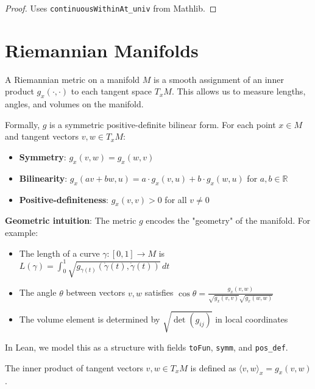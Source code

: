 \begin{proof}
\leanok
Uses \texttt{continuousWithinAt\_univ} from Mathlib.
\end{proof}

\chapter{Riemannian Manifolds}
\label{chap:riemannian}

\begin{definition}
\label{def:riemannian_metric}
\leanok
{}
A Riemannian metric on a manifold $M$ is a smooth assignment of an inner product $g_x(\cdot,\cdot)$ to each tangent space $T_xM$. This allows us to measure lengths, angles, and volumes on the manifold.

Formally, $g$ is a symmetric positive-definite bilinear form. For each point $x \in M$ and tangent vectors $v, w \in T_xM$:
\begin{itemize}
\item \textbf{Symmetry}: $g_x(v, w) = g_x(w, v)$
\item \textbf{Bilinearity}: $g_x(av + bw, u) = a \cdot g_x(v,u) + b \cdot g_x(w,u)$ for $a,b \in \mathbb{R}$
\item \textbf{Positive-definiteness}: $g_x(v, v) > 0$ for all $v \neq 0$
\end{itemize}

\textbf{Geometric intuition}: The metric $g$ encodes the "geometry" of the manifold. For example:
\begin{itemize}
\item The length of a curve $\gamma : [0,1] \to M$ is $L(\gamma) = \int_0^1 \sqrt{g_{\gamma(t)}(\dot{\gamma}(t), \dot{\gamma}(t))} \, dt$
\item The angle $\theta$ between vectors $v,w$ satisfies $\cos \theta = \frac{g_x(v,w)}{\sqrt{g_x(v,v)} \sqrt{g_x(w,w)}}$
\item The volume element is determined by $\sqrt{\det(g_{ij})}$ in local coordinates
\end{itemize}

In Lean, we model this as a structure with fields \texttt{toFun}, \texttt{symm}, and \texttt{pos\_def}.
\end{definition}

\begin{definition}
\label{def:inner_product}
\leanok
{}
The inner product of tangent vectors $v, w \in T_xM$ is defined as $\langle v, w \rangle_x = g_x(v, w)$.
\end{definition}

